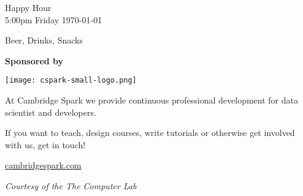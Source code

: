 \documentclass[a4paper,portrait]{article}
\begin{document}
\sf
\thispagestyle{empty}

\begin{center}

    {\Large Happy Hour} \\ \smallskip
    {\large 5:00pm Friday \today}

    \vfill

    {\huge Beer, Drinks, Snacks}\\ \bigskip \bigskip

    \vfill

    \textbf{\Large Sponsored by} \\ \bigskip

    \texttt{[image: cspark-small-logo.png]} \bigskip \bigskip

    \begin{minipage}{0.6\textwidth}{\large
At Cambridge Spark we provide continuous professional development for
data scientist and developers.

\bigskip

If you want to teach, design courses, write tutorials or otherwise get
involved with us, get in touch!

\bigskip \centering

}
    \end{minipage}

    \Large \url{cambridgespark.com}

    \vfill

    \textit{\Large Courtesy of the The Computer Lab}

\end{center}

\medskip
\end{document}
